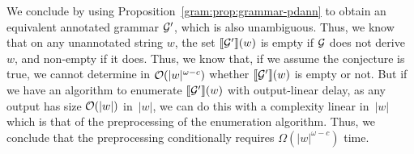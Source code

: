 We conclude by using Proposition~\ref{gram:prop:grammar-pdann} to obtain an equivalent annotated
grammar $\mathcal{G}'$, which is also unambiguous. Thus, we know that on any unannotated
string $w$, the set ${\llbracket{\mathcal{G}'}\rrbracket}(w)$ is empty if $\mathcal{G}$ does not derive
$w$, and non-empty if it does. Thus, we know that, if we assume the conjecture is true, we cannot determine
in $\mathcal{O}(|w|^{\omega-c})$ whether ${\llbracket{\mathcal{G}'}\rrbracket}(w)$ is empty or not. But if we have
an algorithm to enumerate ${\llbracket{\mathcal{G}'}\rrbracket}(w)$  with output-linear delay, as any
output has size $\mathcal{O}(|w|)$ in~$|w|$, we can do this with a complexity linear in~$|w|$
which is that of the preprocessing of the enumeration algorithm. Thus, we
conclude that the preprocessing conditionally requires $\Omega(|w|^{\omega-c})$ time.

%
%
%
%
%
%
%

%
%

%
%
%
%
%
%


%
%
%

%
%
%
%
%
%
